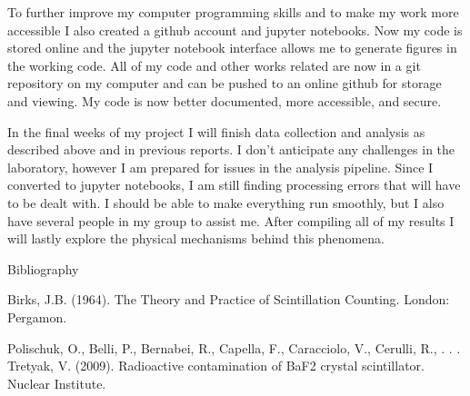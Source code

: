 \documentclass{article}
\begin{document}
To further improve my computer programming skills and to make my work more accessible I also created a github account and jupyter notebooks. Now my code is stored online and the jupyter notebook interface allows me to generate figures in the working code. All of my code and other works related are now in a git repository on my computer and can be pushed to an online github for storage and viewing. My code is now better documented, more accessible, and secure. 

In the final weeks of my project I will finish data collection and analysis as described above and in previous reports. I don't anticipate any challenges in the laboratory, however I am prepared for issues in the analysis pipeline. Since I converted to jupyter notebooks, I am still finding processing errors that will have to be dealt with. I should be able to make everything run smoothly, but I also have several people in my group to assist me. After compiling all of my results I will lastly explore the physical mechanisms behind this phenomena.



\setlength{\parskip}{2em}
\noindent
Bibliography

\noindent
Birks, J.B. (1964). The Theory and Practice of Scintillation Counting. London:
Pergamon.

\noindent
Polischuk, O., Belli, P., Bernabei, R., Capella, F., Caracciolo, V., Cerulli, R., . . . Tretyak, V. (2009). Radioactive contamination of BaF2 crystal scintillator. Nuclear Institute.
\end{document}
